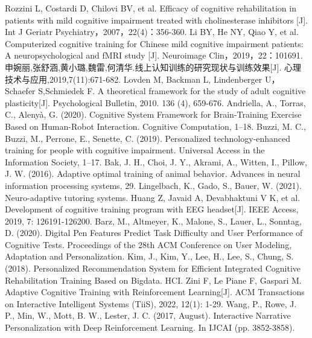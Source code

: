 \documentclass{article}
\begin{document}
    
    \begin{thebibliography}{99}  

        Rozzini L, Costardi D, Chilovi BV, et al. Efficacy of cognitive rehabilitation in patients with mild cognitive impairment treated with cholinesterase inhibitors [J]. Int J Geriatr Psychiatry，2007，22(4)：356-360.
        Li BY, He NY, Qiao Y, et al. Computerized cognitive training for Chinese mild cognitive impairment patients: A neuropsychological and fMRI study [J]. Neuroimage Clin，2019，22：101691.
        申婉丽,张舒涵,黄小璐,魏雷,何清华.线上认知训练的研究现状与训练效果[J]. 心理技术与应用,2019,7(11):671-682.
        Lovden M, Backman L, Lindenberger U，Schaefer S,Schmiedek F. A theoretical framework for the study of adult cognitive plasticity[J]. Psychological Bulletin, 2010. 136 (4), 659-676.
        Andriella, A., Torras, C.,  Alenyà, G. (2020). Cognitive System Framework for Brain-Training Exercise Based on Human-Robot Interaction. Cognitive Computation, 1–18.
        Buzzi, M. C., Buzzi, M., Perrone, E., Senette, C. (2019). Personalized technology-enhanced training for people with cognitive impairment. Universal Access in the Information Society, 1–17. 
        Bak, J. H., Choi, J. Y., Akrami, A., Witten, I.,  Pillow, J. W. (2016). Adaptive optimal training of animal behavior. Advances in neural information processing systems, 29.
        Lingelbach, K., Gado, S.,  Bauer, W. (2021). Neuro-adaptive tutoring systems. 
        Huang Z, Javaid A, Devabhaktuni V K, et al. Development of cognitive training program with EEG headset[J]. IEEE Access, 2019, 7: 126191-126200.
        Barz, M., Altmeyer, K., Malone, S., Lauer, L., Sonntag, D. (2020). Digital Pen Features Predict Task Difficulty and User Performance of Cognitive Tests. Proceedings of the 28th ACM Conference on User Modeling, Adaptation and Personalization. 
        Kim, J., Kim, Y., Lee, H., Lee, S.,  Chung, S. (2018). Personalized Recommendation System for Efficient Integrated Cognitive Rehabilitation Training Based on Bigdata. HCI.
        Zini F, Le Piane F, Gaspari M. Adaptive Cognitive Training with Reinforcement Learning[J]. ACM Transactions on Interactive Intelligent Systems (TiiS), 2022, 12(1): 1-29.
        Wang, P., Rowe, J. P., Min, W., Mott, B. W.,  Lester, J. C. (2017, August). Interactive Narrative Personalization with Deep Reinforcement Learning. In IJCAI (pp. 3852-3858).

\end{thebibliography}
\end{document}
